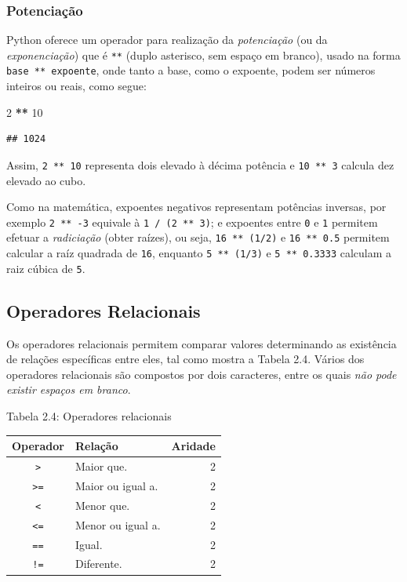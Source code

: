 \documentclass[
]{book}
\newenvironment{Shaded}{\begin{snugshade}}{\end{snugshade}}
\newcommand{\DecValTok}[1]{\textcolor[rgb]{0.00,0.00,0.81}{#1}}
\newcommand{\OperatorTok}[1]{\textcolor[rgb]{0.81,0.36,0.00}{\textbf{#1}}}
\begin{document}
\hypertarget{potenciauxe7uxe3o}{%
\subsubsection{Potenciação}\label{potenciauxe7uxe3o}}

Python oferece um operador para realização da \emph{potenciação} (ou da \emph{exponenciação}) que é \texttt{**} (duplo asterisco, sem espaço em branco), usado na forma \texttt{base\ **\ expoente}, onde tanto a base, como o expoente, podem ser números inteiros ou reais, como segue:

\begin{Shaded}
\begin{Highlighting}[]
\DecValTok{2} \OperatorTok{**} \DecValTok{10}
\end{Highlighting}
\end{Shaded}

\begin{verbatim}
## 1024
\end{verbatim}

Assim, \texttt{2\ **\ 10} representa dois elevado à décima potência e \texttt{10\ **\ 3} calcula dez elevado ao cubo.

Como na matemática, expoentes negativos representam potências inversas, por exemplo \texttt{2\ **\ -3} equivale à \texttt{1\ /\ (2\ **\ 3)}; e expoentes entre \texttt{0} e \texttt{1} permitem efetuar a \emph{radiciação} (obter raízes), ou seja, \texttt{16\ **\ (1/2)} e \texttt{16\ **\ 0.5} permitem calcular a raíz quadrada de \texttt{16}, enquanto \texttt{5\ **\ (1/3)} e \texttt{5\ **\ 0.3333} calculam a raiz cúbica de \texttt{5}.

\hypertarget{comput-opera-relac}{%
\subsection{Operadores Relacionais}\label{comput-opera-relac}}

Os operadores relacionais permitem comparar valores determinando as existência de relações específicas entre eles, tal como mostra a Tabela 2.4. Vários dos operadores relacionais são compostos por dois caracteres, entre os quais \emph{não pode existir espaços em branco}.

Tabela 2.4: Operadores relacionais

\begin{longtable}[]{@{}clr@{}}
\toprule
Operador & Relação & Aridade \\
\midrule
\endhead
\texttt{\textgreater{}} & Maior que. & 2 \\
\texttt{\textgreater{}=} & Maior ou igual a. & 2 \\
\texttt{\textless{}} & Menor que. & 2 \\
\texttt{\textless{}=} & Menor ou igual a. & 2 \\
\texttt{==} & Igual. & 2 \\
\texttt{!=} & Diferente. & 2 \\
\bottomrule
\end{longtable}
\end{document}
